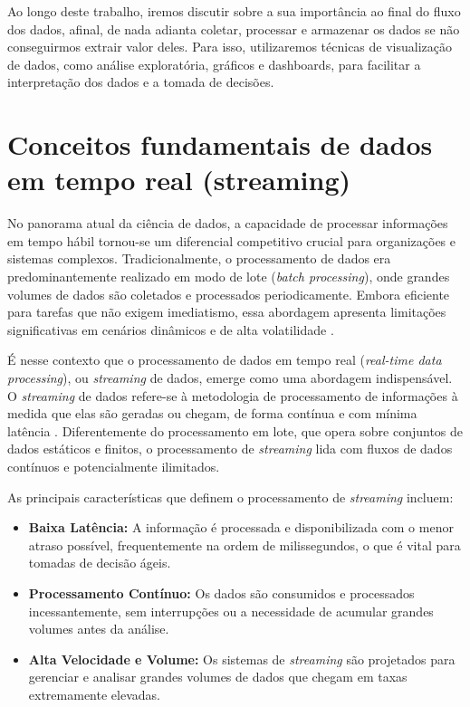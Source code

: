 \documentclass[12pt, %
openright, 
oneside, %
a4paper,    %
brazil]{facom-ufu-abntex2}
\begin{document}
Ao longo deste trabalho, iremos discutir sobre a sua importância ao final do fluxo dos dados, afinal, de nada adianta coletar, processar e armazenar os dados se não conseguirmos extrair valor deles. Para isso, utilizaremos técnicas de visualização de dados, como
análise exploratória, gráficos e dashboards, para facilitar a interpretação dos dados e a tomada de decisões.

\section{Conceitos fundamentais de dados em tempo real (streaming)}

No panorama atual da ciência de dados, a capacidade de processar informações em tempo hábil 
tornou-se um diferencial competitivo crucial para organizações e sistemas complexos. 
Tradicionalmente, o processamento de dados era predominantemente realizado em modo de lote 
(\textit{batch processing}), onde grandes volumes de dados são coletados e processados 
periodicamente. Embora eficiente para tarefas que não exigem imediatismo, essa abordagem apresenta 
limitações significativas em cenários dinâmicos e de alta volatilidade \cite{Hashem2015BigData}.

É nesse contexto que o processamento de dados em tempo real (\textit{real-time data processing}), 
ou \textit{streaming} de dados, emerge como uma abordagem indispensável. O \textit{streaming} de 
dados refere-se à metodologia de processamento de informações à medida que elas são geradas ou chegam, 
de forma contínua e com mínima latência \cite{Xu2018RealTime}. Diferentemente do 
processamento em lote, que opera sobre conjuntos de dados estáticos e finitos, o processamento 
de \textit{streaming} lida com fluxos de dados contínuos e potencialmente ilimitados.

As principais características que definem o processamento de \textit{streaming} incluem:
\begin{itemize}
\item \textbf{Baixa Latência:} A informação é processada e disponibilizada com o menor atraso possível, frequentemente na ordem de milissegundos, o que é vital para tomadas de decisão ágeis.
\item \textbf{Processamento Contínuo:} Os dados são consumidos e processados incessantemente, sem interrupções ou a necessidade de acumular grandes volumes antes da análise.
\item \textbf{Alta Velocidade e Volume:} Os sistemas de \textit{streaming} são projetados para gerenciar e analisar grandes volumes de dados que chegam em taxas extremamente elevadas.
\end{itemize}
\end{document}
